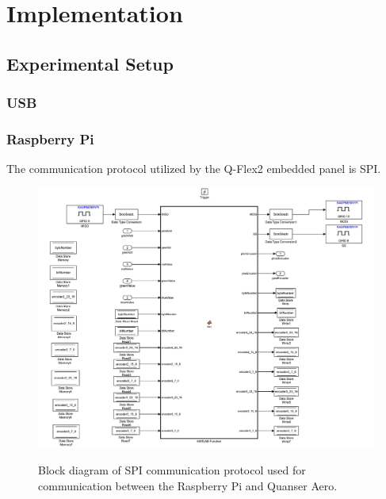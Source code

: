 \chapter{Implementation}
\label{ch: Chapter5}

\section{Experimental Setup}
\subsection{USB}


\subsection{Raspberry Pi}
The communication protocol utilized by the Q-Flex2 embedded panel is SPI.  
\begin{figure}[!htbp]
    \centering
    \includegraphics[width=.46\textwidth,keepaspectratio=true]{figs/img/SPI_COM.pdf}
    \label{fig:SPI_COM}
    \caption{Block diagram of SPI communication protocol used for communication between the Raspberry Pi and Quanser Aero.}
\end{figure}


